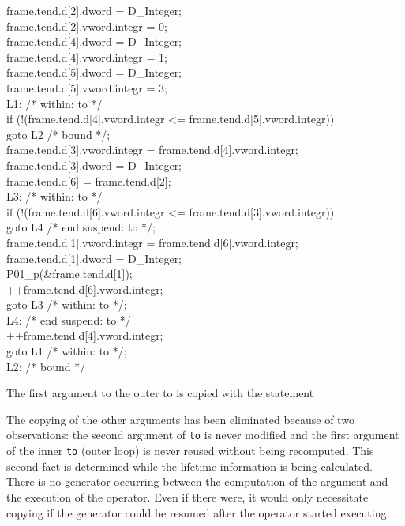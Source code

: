 \goodbreak
\begin{iconcode}
\>\>frame.tend.d[2].dword = D\_Integer;\\
\>\>frame.tend.d[2].vword.integr = 0;\\
\>\>frame.tend.d[4].dword = D\_Integer;\\
\>\>frame.tend.d[4].vword.integr = 1;\\
\>\>frame.tend.d[5].dword = D\_Integer;\\
\>\>frame.tend.d[5].vword.integr = 3;\\
\>L1: /* within: to */\\
\>\>if (!(frame.tend.d[4].vword.integr <= frame.tend.d[5].vword.integr))\\
\>\>\>goto L2 /* bound */;\\
\>\>frame.tend.d[3].vword.integr = frame.tend.d[4].vword.integr;\\
\>\>frame.tend.d[3].dword = D\_Integer;\\
\>\>frame.tend.d[6] = frame.tend.d[2];\\
\>L3: /* within: to */\\
\>\>if (!(frame.tend.d[6].vword.integr <= frame.tend.d[3].vword.integr))\\
\>\>\>goto L4 /* end suspend: to */;\\
\>\>frame.tend.d[1].vword.integr = frame.tend.d[6].vword.integr;\\
\>\>frame.tend.d[1].dword = D\_Integer;\\
\>\>P01\_p(\&frame.tend.d[1]);\\
\>\>++frame.tend.d[6].vword.integr;\\
\>\>goto L3 /* within: to */;\\
\>L4: /* end suspend: to */\\
\>\>++frame.tend.d[4].vword.integr;\\
\>\>goto L1 /* within: to */;\\
\>L2: /* bound */\\
\end{iconcode}

\noindent
The first argument to the outer to is copied with the statement 


\noindent
The copying of the other arguments has been eliminated because of two
observations: the second argument of \texttt{to} is never modified and
the first argument of the inner \texttt{to} (outer loop) is never
reused without being recomputed. This second fact is determined while
the lifetime information is being calculated. There is no generator
occurring between the computation of the argument and the execution of
the operator. Even if there were, it would only necessitate copying if
the generator could be resumed after the operator started executing.

